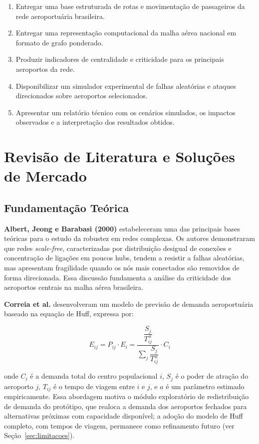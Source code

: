 \documentclass[12pt,a4paper]{article}
\begin{document}
\begin{enumerate}[leftmargin=*, label=\textbf{OE\arabic*.}]
  \item Entregar uma base estruturada de rotas e movimentação de passageiros da rede
        aeroportuária brasileira.
  \item Entregar uma representação computacional da malha aérea nacional em formato de grafo
        ponderado.
  \item Produzir indicadores de centralidade e criticidade para os principais aeroportos da rede.
  \item Disponibilizar um simulador experimental de falhas aleatórias e ataques direcionados
        sobre aeroportos selecionados.
  \item Apresentar um relatório técnico com os cenários simulados, os impactos observados e a
        interpretação dos resultados obtidos.
\end{enumerate}

\section{Revisão de Literatura e Soluções de Mercado}
\label{sec:lit}

\subsection{Fundamentação Teórica}

\textbf{Albert, Jeong e Barabasi (2000)} estabeleceram uma das principais bases teóricas para o
estudo da robustez em redes complexas. Os autores demonstraram que redes \textit{scale-free},
caracterizadas por distribuição desigual de conexões e concentração de ligações em poucos hubs,
tendem a resistir a falhas aleatórias, mas apresentam fragilidade quando os nós mais conectados
são removidos de forma direcionada. Essa discussão fundamenta a análise da criticidade dos
aeroportos centrais na malha aérea brasileira.

\textbf{Correia et al.} desenvolveram um modelo de previsão de demanda aeroportuária baseado
na equação de Huff, expressa por:

\begin{equation}
  E_{ij} = P_{ij} \cdot E_i = \frac{\dfrac{S_j}{T_{ij}^{\,a}}}{\displaystyle\sum_{j}
  \dfrac{S_j}{T_{ij}^{\,a}}} \cdot C_i
\end{equation}

\noindent onde $C_i$ é a demanda total do centro populacional $i$, $S_j$ é o poder de atração
do aeroporto $j$, $T_{ij}$ é o tempo de viagem entre $i$ e $j$, e $a$ é um parâmetro estimado
empiricamente. Essa abordagem motiva o módulo exploratório de redistribuição de demanda do
protótipo, que realoca a demanda dos aeroportos fechados para alternativas próximas com capacidade
disponível; a adoção do modelo de Huff completo, com tempos de viagem, permanece como refinamento
futuro (ver Seção~\ref{sec:limitacoes}).
\end{document}
